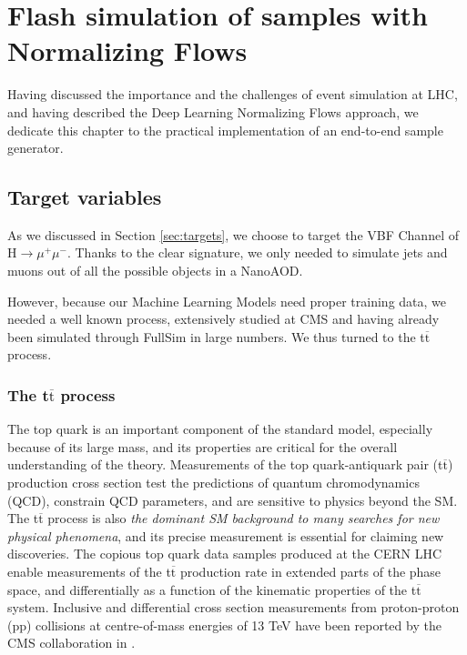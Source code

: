 \chapter{Flash simulation of samples with Normalizing Flows}\label{ch:fs} %

Having discussed the importance and the challenges of event simulation at LHC, and having described the Deep Learning Normalizing Flows approach, we dedicate this chapter to the practical implementation of an end-to-end sample generator.

\section{Target variables}

As we discussed in Section \ref{sec:targets}, we choose to target the VBF Channel of H$\rightarrow\mu^+\mu^-$. Thanks to the clear signature, we only needed to simulate jets and muons out of all the possible objects in a NanoAOD. 

However, because our Machine Learning Models need proper training data, we needed a well known process, extensively studied at CMS and having already been simulated through FullSim in large numbers. We thus turned to the t$\overline{\text{t}}$ process.

\subsection{The t$\overline{\text{t}}$ process}
The top quark is an important component of the standard model, especially because of
its large mass, and its properties are critical for the overall understanding of the theory. Measurements of the top quark-antiquark pair (t$\overline{\text{t}}$) production cross section test the predictions of
quantum chromodynamics (QCD), constrain QCD parameters, and are sensitive to physics beyond the SM. The t$\overline{\text{t}}$ process is also \emph{the dominant SM background to many searches for new
physical phenomena}, and its precise measurement is essential for claiming new discoveries.
The copious top quark data samples produced at the CERN LHC enable measurements of the t$\overline{\text{t}}$
production rate in extended parts of the phase space, and differentially as a function of the kinematic properties of the t$\overline{\text{t}}$ system. Inclusive and differential cross section measurements from
proton-proton (pp) collisions at centre-of-mass energies of 13 TeV have been reported by
the CMS collaboration in \cite{Sirunyan_2017}.

